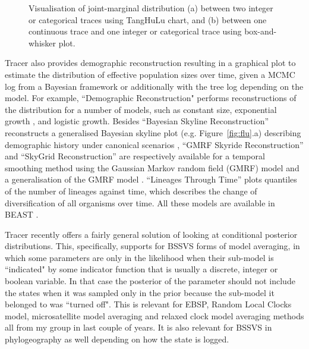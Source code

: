 \documentclass{bioinfo}
\begin{document}
\begin{figure}[ht]
\caption{Visualisation of joint-marginal distribution (a) between two integer or categorical traces using TangHuLu chart, and (b) between one continuous trace and one integer or categorical trace using box-and-whisker plot.}
\label{fig:tanghulu}
\end{figure}


Tracer also provides demographic reconstruction resulting in a graphical plot to estimate the distribution of effective population sizes over time, given a MCMC log from a Bayesian framework or additionally with the tree log depending on the model.
For example, ``Demographic Reconstruction" performs reconstructions of the distribution for a number of models, such as constant size, exponential growth \citep{drummond2002estimating}, and logistic growth. %
Besides ``Bayesian Skyline Reconstruction'' reconstructs a generalised Bayesian skyline plot (e.g. Figure~\ref{fig:flu}.a) describing demographic history under canonical scenarios \citep{drummond2005bayesian},
``GMRF Skyride Reconstruction'' and ``SkyGrid Reconstruction'' are respectively available for a temporal smoothing method using the Gaussian Markov random field (GMRF) model  \citep{minin2008smooth} and a generalisation of the GMRF model \citep{gill2012improving}.
``Lineages Through Time'' plots quantiles of the number of lineages against time, which describes the change of diversification of all organisms over time. %
All these models are available in BEAST \citep{drummond2007beast}. 

Tracer recently offers a fairly general solution of looking at conditional posterior distributions. This, specifically, supports for BSSVS forms of model averaging, in which some parameters are only in the likelihood when their sub-model is ``indicated" by some indicator function that is usually a discrete, integer or boolean variable. In that case the posterior of the parameter should not include the states when it was sampled only in the prior because the sub-model it belonged to was ``turned off". This is relevant for EBSP, Random Local Clocks model, microsatellite model averaging and relaxed clock model averaging methods all from my group in last couple of years. It is also relevant for BSSVS in phylogeography as well depending on how the state is logged.
\end{document}
